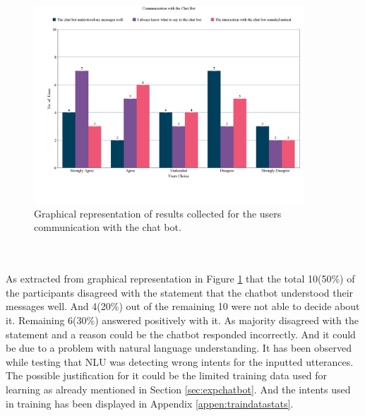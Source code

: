 \begin{figure}[!h]
    \centering
    \includegraphics[width=0.9\textwidth]{img/Communication_with_the_Chat_Bot_Updated.png}
    \caption{Graphical representation of results collected for the users communication with the chat bot.}
    \label{fig:communwithBot}
\end{figure}
\\~\\
As extracted from graphical representation in Figure \ref{fig:communwithBot} that the total 10(50\%) of the participants disagreed with the statement that the chatbot understood their messages well. And 4(20\%) out of the remaining 10 were not able to decide about it. Remaining 6(30\%) answered positively with it. As majority disagreed with the statement and a reason could be the chatbot responded incorrectly. And it could be due to a problem with natural language understanding. It has been observed while testing that NLU was detecting wrong intents for the inputted utterances. The possible justification for it could be the limited training data used for learning as already mentioned in Section \ref{sec:expchatbot}. And the intents used in training has been displayed in Appendix \ref{appen:traindatastats}.

